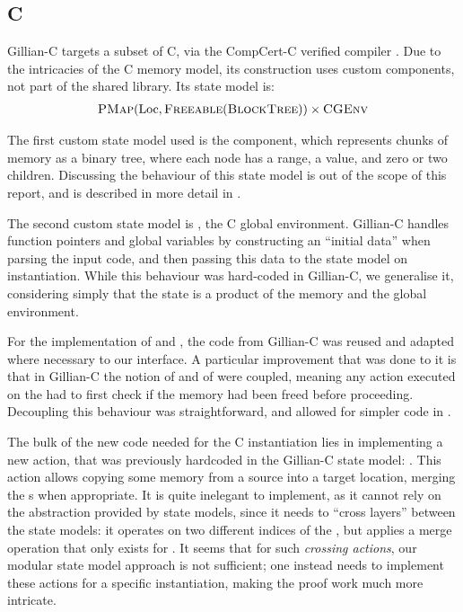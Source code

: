 \subsection{C}

Gillian-C \cite{gillian0} targets a subset of C, via the CompCert-C verified compiler \cite{compcert}. Due to the intricacies of the C memory model, its construction uses custom components, not part of the shared library. Its state model is: \begin{align*}
	\textsc{PMap}(\text{Loc}, \textsc{Freeable}(\textsc{BlockTree})) \times \textsc{CGEnv}
\end{align*}

The first custom state model used is the \BlockTree{} component, which represents chunks of memory as a binary tree, where each node has a range, a value, and zero or two children. Discussing the behaviour of this state model is out of the scope of this report, and is described in more detail in \cite{sacha-phd}.

The second custom state model is \CGEnv{}, the C global environment. Gillian-C handles function pointers and global variables by constructing an ``initial data'' when parsing the input code, and then passing this data to the state model on instantiation. While this behaviour was hard-coded in Gillian-C, we generalise it, considering simply that the state is a product of the memory and the global environment.

For the implementation of \BlockTree{} and \CGEnv, the code from Gillian-C was reused and adapted where necessary to our interface. A particular improvement that was done to it is that in Gillian-C the notion of \Freeable{} and of \BlockTree{} were coupled, meaning any action executed on the \BlockTree{} had to first check if the memory had been freed before proceeding. Decoupling this behaviour was straightforward, and allowed for simpler code in \BlockTree.

The bulk of the new code needed for the C instantiation lies in implementing a new action, that was previously hardcoded in the Gillian-C state model: . This action allows copying some memory from a source into a target location, merging the \BlockTree{}s when appropriate. It is quite inelegant to implement, as it cannot rely on the abstraction provided by state models, since it needs to ``cross layers'' between the state models: it operates on two different indices of the \PMap, but applies a merge operation that only exists for \BlockTree. It seems that for such \emph{crossing actions}, our modular state model approach is not sufficient; one instead needs to implement these actions for a specific instantiation, making the proof work much more intricate.

